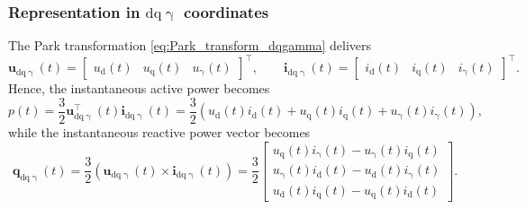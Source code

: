 \begin{frame}
    \frametitle{Representation in $\mathrm{dq}\upgamma$ coordinates}
    The Park transformation \eqref{eq:Park_transform_dqgamma} delivers
    \begin{equation}
        \bm{u}_{\mathrm{dq}\upgamma}(t)=\begin{bmatrix} u_{\mathrm{d}}(t) & u_{\mathrm{q}}(t) & u_{\mathrm{\upgamma}}(t) \end{bmatrix}^\top,
        \qquad
        \bm{i}_{\mathrm{dq}\upgamma}(t)=\begin{bmatrix} i_{\mathrm{d}}(t) & i_{\mathrm{q}}(t) & i_{\mathrm{\upgamma}}(t) \end{bmatrix}^\top.
    \end{equation}\pause
    Hence, the instantaneous active power becomes
    \begin{equation}
        p(t)=\frac{3}{2}\bm{u}_{\mathrm{dq}\upgamma}^{\top}(t)\bm{i}_{\mathrm{dq}\upgamma}(t) = \frac{3}{2}\left(u_{\mathrm{d}}(t)i_{\mathrm{d}}(t) + u_{\mathrm{q}}(t)i_{\mathrm{q}}(t) + u_{\mathrm{\upgamma}}(t)i_{\mathrm{\upgamma}}(t)\right),
    \end{equation}\pause
    while the instantaneous reactive power vector becomes
    \begin{equation}
        \bm{q}_{\mathrm{dq}\upgamma}(t)=\frac{3}{2}\left(\bm{u}_{\mathrm{dq}\upgamma}(t)\times\bm{i}_{\mathrm{dq}\upgamma}(t)\right)=\frac{3}{2}
        \begin{bmatrix}
            u_{\mathrm{q}}(t)i_{\mathrm{\upgamma}}(t)-u_{\mathrm{\upgamma}}(t)i_{\mathrm{q}}(t) \\
            u_{\mathrm{\upgamma}}(t)i_{\mathrm{d}}(t)-u_{\mathrm{d}}(t)i_{\mathrm{\upgamma}}(t) \\
            u_{\mathrm{d}}(t)i_{\mathrm{q}}(t)-u_{\mathrm{q}}(t)i_{\mathrm{d}}(t)
        \end{bmatrix}.
    \end{equation}
\end{frame}

